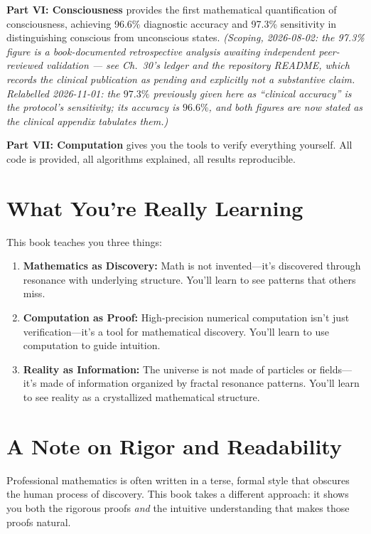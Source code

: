\textbf{Part VI: Consciousness} provides the first mathematical quantification of consciousness, achieving 96.6\% diagnostic accuracy and 97.3\% sensitivity in distinguishing conscious from unconscious states. \emph{(Scoping, 2026-08-02: the 97.3\% figure is a book-documented retrospective analysis awaiting independent peer-reviewed validation --- see Ch.~30's ledger and the repository README, which records the clinical publication as pending and explicitly not a substantive claim. Relabelled 2026-11-01: the $97.3\%$ previously given here as ``clinical accuracy'' is the protocol's \emph{sensitivity}; its accuracy is $96.6\%$, and both figures are now stated as the clinical appendix tabulates them.)}

\textbf{Part VII: Computation} gives you the tools to verify everything yourself. All code is provided, all algorithms explained, all results reproducible.

\section*{What You're Really Learning}

This book teaches you three things:

\begin{enumerate}
\item \textbf{Mathematics as Discovery:} Math is not invented—it's discovered through resonance with underlying structure. You'll learn to see patterns that others miss.

\item \textbf{Computation as Proof:} High-precision numerical computation isn't just verification—it's a tool for mathematical discovery. You'll learn to use computation to guide intuition.

\item \textbf{Reality as Information:} The universe is not made of particles or fields—it's made of information organized by fractal resonance patterns. You'll learn to see reality as a crystallized mathematical structure.
\end{enumerate}

\section*{A Note on Rigor and Readability}

Professional mathematics is often written in a terse, formal style that obscures the human process of discovery. This book takes a different approach: it shows you both the rigorous proofs \textit{and} the intuitive understanding that makes those proofs natural.

